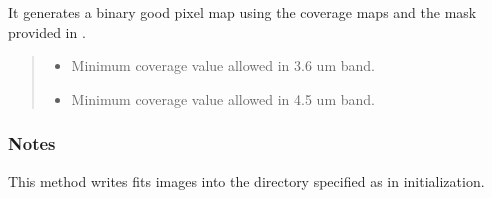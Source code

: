 \documentclass[letterpaper,12pt,english]{sphinxmanual}
\begin{document}
\begin{fulllineitems}
\begin{fulllineitems}
\sphinxAtStartPar
It generates a binary good pixel map using the coverage maps and the mask provided in
.
\begin{quote}\begin{description}
\begin{itemize}
\item {} 
\sphinxAtStartPar
{} \textendash{} Minimum coverage value allowed in 3.6 um band.

\item {} 
\sphinxAtStartPar
{} \textendash{} Minimum coverage value allowed in 4.5 um band.

\end{itemize}

\end{description}\end{quote}
\subsubsection*{Notes}

\sphinxAtStartPar
This method writes fits images into the directory specified as  in initialization.

\end{fulllineitems}



\end{fulllineitems}
\end{document}
